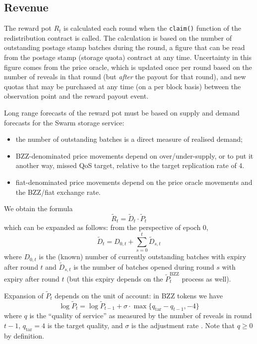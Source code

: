 \subsection{Revenue}
\label{section:revenue}

The reward pot $R_t$ is calculated each round when the \texttt{claim()} function of the redistribution contract is called.
%
The calculation is based on the number of outstanding postage stamp batches during the round, a figure that can be read from the postage stamp (storage quota) contract at any time.
%
Uncertainty in this figure comes from the price oracle, which is updated once per round based on the number of reveals in that round (but \emph{after} the payout for that round), and new quotas that may be purchased at any time (on a per block basis) between the observation point and the reward payout event.

Long range forecasts of the reward pot must be based on supply and demand forecasts for the Swarm storage service:
\begin{itemize}
  \item 
    the number of outstanding batches is a direct measure of realised demand;
  \item
    BZZ-denominated price movements depend on over/under-supply, or to put it another way, missed QoS target, relative to the target replication rate of $4$.
  \item
    fiat-denominated price movements depend on the price oracle movements and the BZZ/fiat exchange rate.
\end{itemize}
%
We obtain the formula
\[
  \tilde{R}_t = \tilde{D}_t \cdot \tilde{P}_t 
\]
which can be expanded as follows: from the perspective of epoch $0$,
\[
  \tilde{D}_t = D_{0,t} + \sum_{s=0}^{t} \tilde{D}_{s,t}
\]
where $D_{0,t}$ is the (known) number of currently outstanding batches with expiry after round $t$ and $\tilde{D}_{s,t}$ is the number of batches opened during round $s$ with expiry after round $t$ (but this expiry depends on the $\tilde{P}_t^\mathrm{BZZ}$ process as well).

Expansion of $\tilde{P}_t$ depends on the unit of account: in BZZ tokens we have 
\[
  \log\tilde{P}_t = \log\tilde{P}_{t-1} + \sigma\cdot \max\{q_\mathrm{tar} - q_{t-1},-4\}
\]
where $q$ is the ``quality of service'' as measured by the number of reveals in round $t-1$, $q_\mathrm{tar}=4$ is the target quality, and $\sigma$ is the adjustment rate \cite[\S3.4.5]{book-of-swarm}.
%
Note that $q\geq 0$ by definition.



